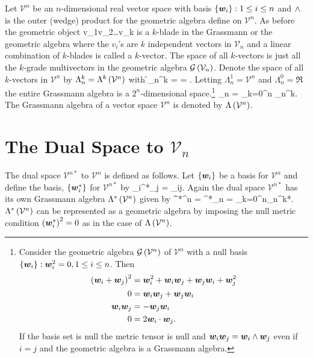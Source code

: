 Let $\mathcal{V}^{n}$ be an $n$-dimensional real vector space with basis $\left \{ {\bm{w}_{i}} \right \}: 1\le i \le n$ and $\wedge$ is the
outer (wedge) product for the geometric algebra define on $\mathcal{V}^{n}$. As before the geometric object
\be
	v_{1}\W v_{2}\W\dots\W v_{k}
\ee
is a $k$-blade in the Grassmann or the geometric algebra where the $v_{i}$'s are $k$ independent vectors in
$\mathcal{V}_{n}$ and a linear combination of $k$-blades is called a $k$-vector.  The space of all $k$-vectors is
just all the $k$-grade multivectors in the geometric algebra $\mathcal{G}\left ( {\mathcal{V}_{n}} \right )$. Denote the space of all
$k$-vectors in $\mathcal{V}^{n}$ by $\Lambda_{n}^{k} = {\Lambda^{k}}\left ( {\mathcal{V}^{n}} \right )$ with
\be
	\f{\dim}{\Lambda_{n}^{k}} =  = .
\ee
Letting $\Lambda_{n}^{1} = \mathcal{V}^{n}$ and $\Lambda_{n}^{0} = \Re$ the entire Grassmann algebra is a 
$2^{n}$-dimensional space.\footnote{Consider the geometric algebra $\mathcal{G}\left ( {\mathcal{V}^{n}} \right )$ of $\mathcal{V}^{n}$
with a null basis $\left \{ {\bm{w}_{i}} \right \}:\bm{w}_{i}^{2}=0,1\le i \le n$. Then 
\begin{align*}
	\left ( {\bm{w}_{i}+\bm{w}_{j}} \right )^2 &= \bm{w}_{i}^{2}+\bm{w}_{i}\bm{w}_{j}+\bm{w}_{j}\bm{w}_{i}+\bm{w}_{j}^{2} \\
	                        0 &= \bm{w}_{i}\bm{w}_{j}+\bm{w}_{j}\bm{w}_{i} \\
	                        \bm{w}_{i}\bm{w}_{j} &= -\bm{w}_{j}\bm{w}_{i} \\
	                        0 &= 2\bm{w}_{i}\cdot\bm{w}_{j}.
\end{align*}
If the basis set is null the metric tensor is null and $\bm{w}_{i}\bm{w}_{j} = \bm{w}_{i}\wedge\bm{w}_{j}$ even if $i=j$ and the geometric
algebra is a Grassmann algebra.}
\be
	\Lambda_{n} = \sum_{k=0}^{n} \Lambda_{n}^{k}.
\ee
The Grassmann algebra of a vector space $\mathcal{V}^{n}$ is denoted by ${\Lambda}\left ( {\mathcal{V}^{n}} \right )$.


\section{The Dual Space to $\mathcal{V}_{n}$}

The dual space $\mathcal{V}^{n*}$ to $\mathcal{V}^{n}$ is defined as follows.  Let $\left \{ {\bm{w}_{i}} \right \}$ be a
basis for $\mathcal{V}^{n}$ and define the basis, $\left \{ {\bm{w}_{i}^{*}} \right \}$ for $\mathcal{V}^{n*}$ by
\be\label{eq8_4}
	\wb_{i}^{*}\cdot \wb_{j} = \half\delta_{ij}. 
\ee
Again the dual space $\mathcal{V}^{n*}$ has its own Grassmann algebra ${\Lambda^{*}}\left ( {\mathcal{V}^{n}} \right )$
given by
\be
	\f{\Lambda^{*}}{^{n}} = \Lambda^{*}_{n} = \sum_{k=0}^{n}\Lambda_{n}^{k*}.
\ee
${\Lambda^{*}}\left ( {\mathcal{V}^{n}} \right )$ can be represented as a geometric algebra by imposing the null metric condition
$\left ( {\bm{w}_{i}^{*}} \right )^{2}=0$ as in the case of ${\Lambda}\left ( {\mathcal{V}^{n}} \right )$. 

